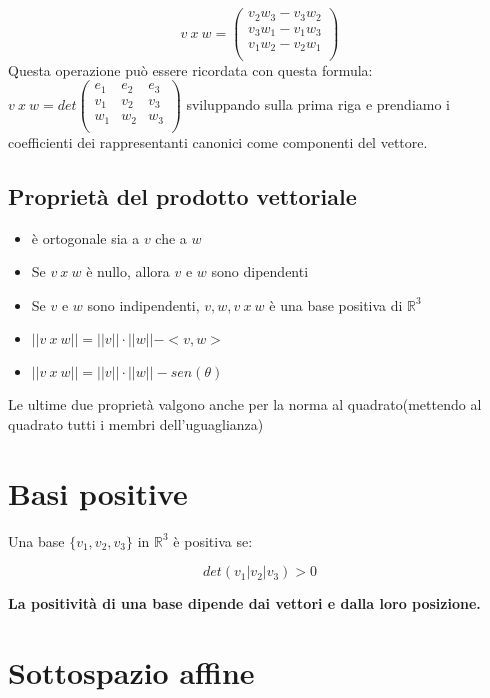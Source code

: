 \documentclass[a4paper, 10pt]{article}
\begin{document}
$$v\ x\ w=\left(\begin{matrix}v_2w_3-v_3w_2\\v_3w_1-v_1w_3\\v_1w_2-v_2w_1\\\end{matrix}\right)$$
Questa operazione può essere ricordata con questa formula: $v\ x\ w=det\left(\begin{matrix}e_1&e_2&e_3\\v_1&v_2&v_3\\w_1&w_2&w_3\\\end{matrix}\right)
$ sviluppando sulla prima riga e prendiamo i coefficienti dei rappresentanti canonici come componenti del vettore.

\subsection{Proprietà del prodotto vettoriale}

\begin{itemize}
	\item è ortogonale sia a $v$ che a $w$
	\item Se $v\ x\ w$ è nullo, allora $v$ e $w$ sono dipendenti
	\item Se $v$ e $w$ sono indipendenti, $v, w, v\ x\ w$ è una base positiva di $\mathbb{R}^3$
	\item $||v\ x\ w|| = ||v|| \cdot ||w|| - <v,w>$
	\item $||v\ x\ w|| = ||v|| \cdot ||w|| - sen(\theta)$
\end{itemize}

Le ultime due proprietà valgono anche per la norma al quadrato(mettendo al quadrato tutti i membri dell'uguaglianza)

\section{Basi positive}

Una base $\{v_1, v_2, v_3\}$ in $\mathbb{R}^3$ è positiva se:

$$det(v_1 | v_2 | v_3) > 0$$

\textbf{La positività di una base dipende dai vettori e dalla loro posizione.}

\section{Sottospazio affine}
\end{document}
